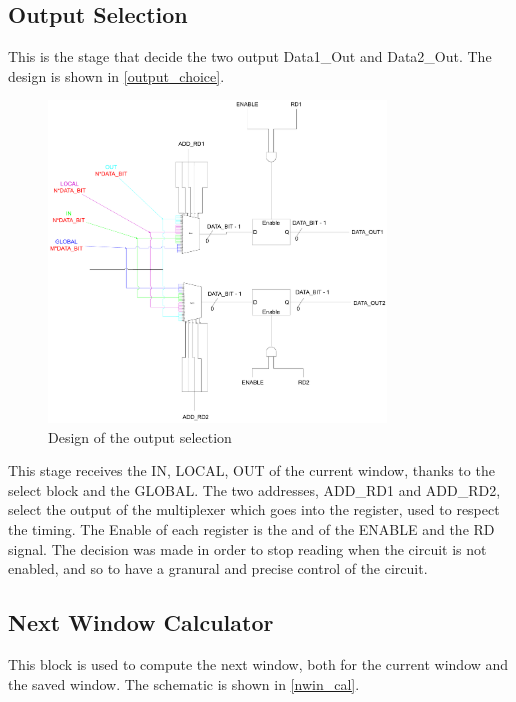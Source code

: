\subsection{Output Selection}
This is the stage that decide the two output Data1\_Out and Data2\_Out. The design is shown in \autoref{output_choice}.

\begin{figure}[H]
  \centering
  \includegraphics[width=0.8\textwidth]{chapters/4_DecodeStage/images/output_choice.pdf}
  \caption{Design of the output selection}
  \label{output_choice}
\end{figure}

This stage receives the IN, LOCAL, OUT of the current window, thanks to the select block and the GLOBAL. The two addresses, ADD\_RD1 and ADD\_RD2, select the output of the multiplexer which goes into the register, used to respect the timing. The Enable of each register is the and of the ENABLE and the RD signal. The decision was made in order to stop reading when the circuit is not enabled, and so to have a granural and precise control of the circuit.

\subsection{Next Window Calculator}

This block is used to compute the next window, both for the current window and the saved window. The schematic is shown in \autoref{nwin_cal}.

